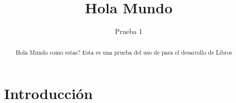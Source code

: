 \documentclass[]{article}
\title{Hola Mundo}
\author{Prueba 1}
\begin{document}
\maketitle

\begin{abstract}
	Hola Mundo como estas? Esta es una prueba del uso de \latex para el desarrollo de Libros

\end{abstract}

\section{Introducción}
\end{document}
